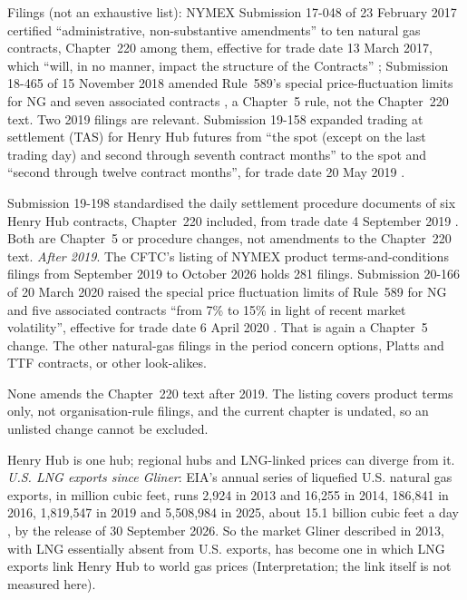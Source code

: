 \begin{qfdefinition}
Filings (not an exhaustive list): NYMEX Submission 17-048 of 23 February 2017 certified ``administrative, non-substantive amendments'' to ten natural gas contracts, Chapter~220 among them, effective for trade date 13 March 2017, which ``will, in no manner, impact the structure of the Contracts'' \citep[pp.~1--2]{nymex-17-048}; Submission 18-465 of 15 November 2018 amended Rule~589's special price-fluctuation limits for NG and seven associated contracts \citep[cover sheet]{nymex-18-465}, a Chapter~5 rule, not the Chapter~220 text. Two 2019 filings are relevant. Submission 19-158 expanded trading at settlement (TAS) for Henry Hub futures from ``the spot (except on the last trading day) and second through seventh contract months'' to the spot and ``second through twelve contract months'', for trade date 20 May 2019 \citep[pp.~1--2]{nymex-19-158}.

Submission 19-198 standardised the daily settlement procedure documents of six Henry Hub contracts, Chapter~220 included, from trade date 4 September 2019 \citep[pp.~1--2]{nymex-19-198}. Both are Chapter~5 or procedure changes, not amendments to the Chapter~220 text. \emph{After 2019}. The CFTC's listing of NYMEX product terms-and-conditions filings from September 2019 to October 2026 holds 281 filings. Submission 20-166 of 20 March 2020 raised the special price fluctuation limits of Rule~589 for NG and five associated contracts ``from 7\% to 15\% in light of recent market volatility'', effective for trade date 6 April 2020 \citep[pp.~1--2]{nymex-20-166}. That is again a Chapter~5 change. The other natural-gas filings in the period concern options, Platts and TTF contracts, or other look-alikes.

None amends the Chapter~220 text after 2019. The listing covers product terms only, not organisation-rule filings, and the current chapter is undated, so an unlisted change cannot be excluded.

 Henry Hub is one hub; regional hubs and LNG-linked prices can diverge from it. \emph{U.S. LNG exports since Gliner}: EIA's annual series of liquefied U.S. natural gas exports, in million cubic feet, runs 2{,}924 in 2013 and 16{,}255 in 2014, 186{,}841 in 2016, 1{,}819{,}547 in 2019 and 5{,}508{,}984 in 2025, about 15.1 billion cubic feet a day \citep[series N9133US2]{eia-lng-exports-2026}, by the release of 30 September 2026. So the market Gliner described in 2013, with LNG essentially absent from U.S. exports, has become one in which LNG exports link Henry Hub to world gas prices (Interpretation; the link itself is not measured here).


\end{qfdefinition}
